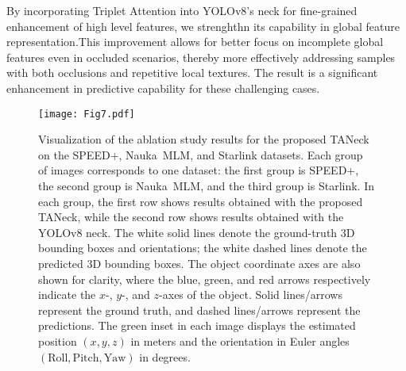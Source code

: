\documentclass[a4paper,fleqn]{cas-sc}
\begin{document}
By incorporating Triplet Attention into YOLOv8's neck for fine-grained enhancement of high level features, we strenghthn its capability in global feature representation.This improvement allows for better focus on incomplete global features even in occluded scenarios, thereby more effectively addressing samples with both occlusions and repetitive local textures. The result is a significant enhancement in predictive capability for these challenging cases.
\

\begin{table}[!htbp]
	\centering
	\caption{TANeck Ablation on SPEED+, Nauka MLM, Starlink synthetic datasets.}
	\label{tab:TANeck_abliation}
\end{table}
\begin{figure}[!htbp]
	\centering	\texttt{[image: Fig7.pdf]} 
		\caption{
        Visualization of the ablation study results for the proposed TANeck on the SPEED+, Nauka~MLM, and Starlink datasets. 
    Each group of images corresponds to one dataset: the first group is SPEED+, the second group is Nauka~MLM, and the third group is Starlink. 
    In each group, the first row shows results obtained with the proposed TANeck, while the second row shows results obtained with the YOLOv8 neck. 
    The white solid lines denote the ground-truth 3D bounding boxes and orientations; the white dashed lines denote the predicted 3D bounding boxes. 
    The object coordinate axes are also shown for clarity, where the blue, green, and red arrows respectively indicate the $x$-, $y$-, and $z$-axes of the object. 
    Solid lines/arrows represent the ground truth, and dashed lines/arrows represent the predictions. 
    The green inset in each image displays the estimated position $(x,y,z)$ in meters and the orientation in Euler angles $(\mathrm{Roll}, \mathrm{Pitch}, \mathrm{Yaw})$ in degrees.
}
	\label{fig:TANeck_abliation}
\end{figure}
\end{document}
